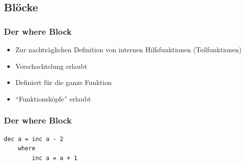 \subsection{Blöcke}
\begin{frame}
\frametitle{Der where Block}
\vspace*{-3ex}
\begin{block}{\vspace*{-3ex}}
\begin{itemize}
  \item Zur nachträglichen Definition von internen Hilfsfunktionen (Teilfunktionen)
  \item Verschachtelung erlaubt
  \item Definiert für die ganze Funktion
  \item "`Funktionsköpfe"' erlaubt
\end{itemize}
\end{block}
\end{frame}

\begin{frame}[fragile]
\frametitle{Der where Block}
\begin{lstlisting}
dec a = inc a - 2
    where	
        inc a = a + 1
\end{lstlisting}
\begin{exampleblock}{\vspace*{-3ex}}
\begin{center}
\vspace*{-1ex}
\scalebox{0.45}{}
\end{center}
\end{exampleblock}
\end{frame}

